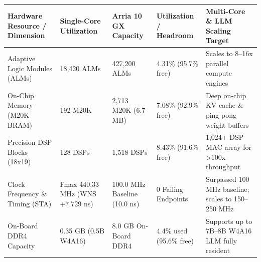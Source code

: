 \documentclass[11pt,a4paper]{article}
\begin{document}
{\footnotesize\renewcommand{\arraystretch}{1.14}\begin{longtable}{@{}L{0.21\textwidth}L{0.16\textwidth}L{0.16\textwidth}L{0.15\textwidth}L{0.22\textwidth}@{}}\toprule

\textbf{Hardware Resource /\allowbreak{} Dimension} & \textbf{Single-Core Utilization} & \textbf{Arria 10 GX Capacity} & \textbf{Utilization /\allowbreak{} Headroom} & \textbf{Multi-Core \& LLM Scaling Target}\\\midrule\endhead

Adaptive Logic Modules (\allowbreak{}ALMs)\allowbreak{} & 18,\allowbreak{}420 ALMs & 427,\allowbreak{}200 ALMs & 4.31\% (\allowbreak{}95.7\% free)\allowbreak{} & Scales to 8--16x parallel compute engines\\[2pt]

On-Chip Memory (\allowbreak{}M20K BRAM)\allowbreak{} & 192 M20K & 2,\allowbreak{}713 M20K (\allowbreak{}6.7 MB)\allowbreak{} & 7.08\% (\allowbreak{}92.9\% free)\allowbreak{} & Deep on-chip KV cache \& ping-pong weight buffers\\[2pt]

Precision DSP Blocks (\allowbreak{}18x19)\allowbreak{} & 128 DSPs & 1,\allowbreak{}518 DSPs & 8.43\% (\allowbreak{}91.6\% free)\allowbreak{} & 1,\allowbreak{}024+\allowbreak{} DSP MAC array for >100x throughput\\[2pt]

Clock Frequency \& Timing (\allowbreak{}STA)\allowbreak{} & Fmax 440.33 MHz (\allowbreak{}WNS +\allowbreak{}7.729 ns)\allowbreak{} & 100.0 MHz Baseline (\allowbreak{}10.0 ns)\allowbreak{} & 0 Failing Endpoints & Surpassed 100 MHz baseline; scales to 150--250 MHz\\[2pt]

On-Board DDR4 Capacity & 0.35 GB (\allowbreak{}0.5B W4A16)\allowbreak{} & 8.0 GB On-Board DDR4 & 4.4\% used (\allowbreak{}95.6\% free)\allowbreak{} & Supports up to 7B--8B W4A16 LLM fully resident\\[2pt]

\bottomrule\end{longtable}}
\end{document}
